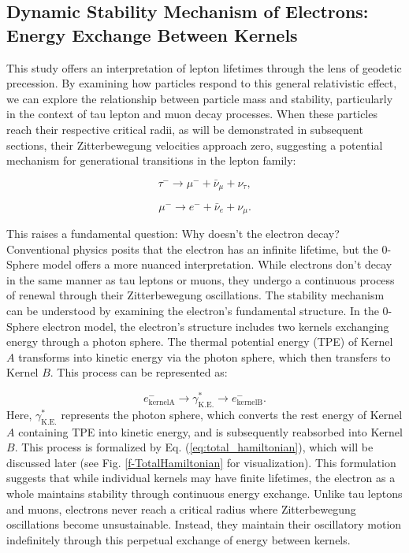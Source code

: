\documentclass[%
 reprint,
 amsmath,amssymb,
 aps,
]{revtex4-1}
\numberwithin{equation}{section}%
\begin{document}
\subsection{Dynamic Stability Mechanism of Electrons:\\ Energy Exchange Between Kernels}
\label{sec:DynamicStabilityMechanism}

This study offers an interpretation of lepton lifetimes through the lens of geodetic precession. By examining how particles respond to this general relativistic effect, we can explore the relationship between particle mass and stability, particularly in the context of tau lepton and muon decay processes. When these particles reach their respective critical radii, as will be demonstrated in subsequent sections, their Zitterbewegung velocities approach zero, suggesting a potential mechanism for generational transitions in the lepton family:

\begin{equation}
\tau^- \rightarrow \mu^- + \bar{\nu}_\mu + \nu_\tau,
\end{equation}

\begin{equation}
\mu^- \rightarrow e^- + \bar{\nu}_e + \nu_\mu.
\label{eq:MuonDecay}
\end{equation}

This raises a fundamental question: Why doesn't the electron decay? Conventional physics posits that the electron has an infinite lifetime, but the 0-Sphere model offers a more nuanced interpretation. While electrons don't decay in the same manner as tau leptons or muons, they undergo a continuous process of renewal through their Zitterbewegung oscillations. The stability mechanism can be understood by examining the electron's fundamental structure. In the 0-Sphere electron model, the electron's structure includes two kernels exchanging energy through a photon sphere. The thermal potential energy (TPE) of Kernel $A$ transforms into kinetic energy via the photon sphere, which then transfers to Kernel $B$. This process can be represented as:

\begin{equation}
e^-_{\mathrm{kernelA}} \rightarrow \gamma^*_{\mathrm{K.E.}} \rightarrow e^-_{\mathrm{kernelB}}.
\label{eq:electron_transfer}
\end{equation}
Here, $\gamma^*_{\mathrm{K.E.}}$ represents the photon sphere, which converts the rest energy of Kernel $A$ containing TPE into kinetic energy, and is subsequently reabsorbed into Kernel $B$. This process is formalized by Eq. (\ref{eq:total_hamiltonian}), which will be discussed later (see Fig. \ref{f-TotalHamiltonian} for visualization). This formulation suggests that while individual kernels may have finite lifetimes, the electron as a whole maintains stability through continuous energy exchange. Unlike tau leptons and muons, electrons never reach a critical radius where Zitterbewegung oscillations become unsustainable. Instead, they maintain their oscillatory motion indefinitely through this perpetual exchange of energy between kernels.
\end{document}
